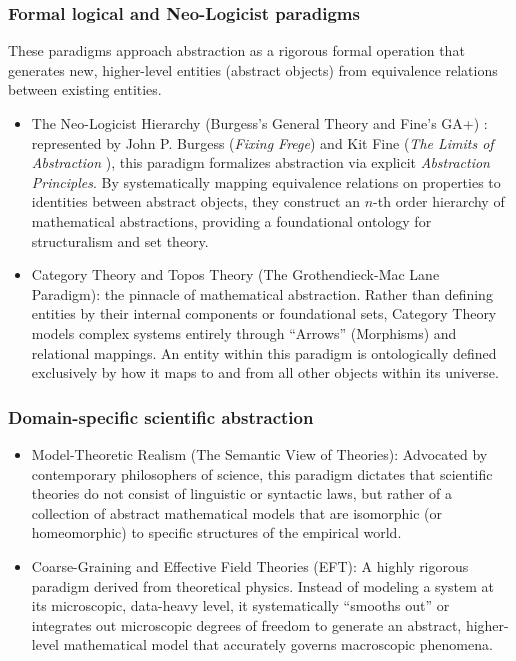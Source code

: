 \documentclass[11pt, a4paper]{article}
\begin{document}
\subsubsection*{Formal logical and Neo-Logicist paradigms}
These paradigms approach abstraction as a rigorous formal operation that generates new, higher-level entities (abstract objects) from equivalence relations between existing entities.
\begin{itemize}
\item \textrm{The Neo-Logicist Hierarchy (Burgess's General Theory and Fine's GA+) \cite{burgess2005fixing}}: represented by John P. Burgess (\textit{Fixing Frege}) and Kit Fine (\textit{The Limits of Abstraction} \cite{fine2002limits}), this paradigm formalizes abstraction via explicit \textit{Abstraction Principles}. By systematically mapping equivalence relations on properties to identities between abstract objects, they construct an $n$-th order hierarchy of mathematical abstractions, providing a foundational ontology for structuralism and set theory.

\item \textrm{Category Theory and Topos Theory (The Grothendieck-Mac Lane Paradigm)\cite{maclane1992sheaves}}: the pinnacle of mathematical abstraction. Rather than defining entities by their internal components or foundational sets, Category Theory models complex systems entirely through ``Arrows'' (Morphisms) and relational mappings. An entity within this paradigm is ontologically defined exclusively by how it maps to and from all other objects within its universe.
\end{itemize}


\subsubsection*{Domain-specific scientific abstraction}
\begin{itemize}
	\item \textrm{Model-Theoretic Realism (The Semantic View of Theories): \cite{suppe1989semantic}} Advocated by contemporary philosophers of science, this paradigm dictates that scientific theories do not consist of linguistic or syntactic laws, but rather of a collection of abstract mathematical models that are isomorphic (or homeomorphic) to specific structures of the empirical world.
	\item \textrm{Coarse-Graining and Effective Field Theories (EFT): \cite{hartmann2001effective}} A highly rigorous paradigm derived from theoretical physics. Instead of modeling a system at its microscopic, data-heavy level, it systematically ``smooths out'' or integrates out microscopic degrees of freedom to generate an abstract, higher-level mathematical model that accurately governs macroscopic phenomena.
\end{itemize}
\end{document}
